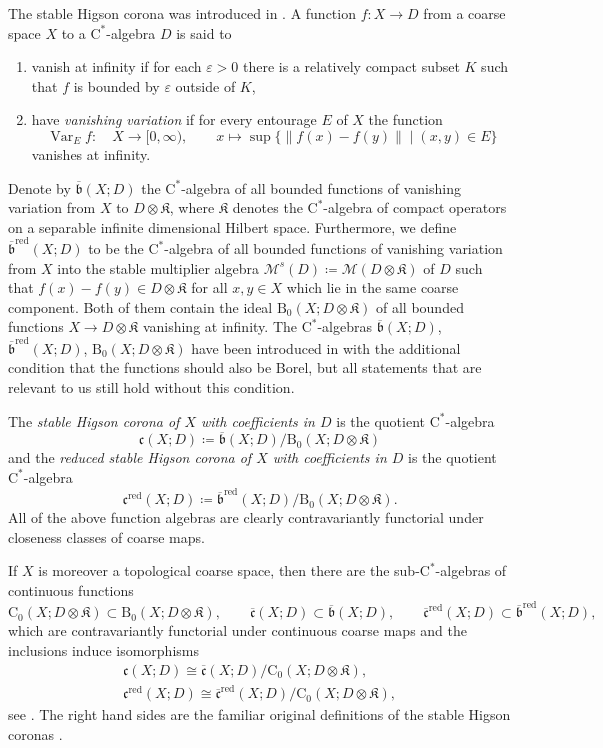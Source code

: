 \documentclass[pdftex]{sigma}
\numberwithin{equation}{section}
\theoremstyle{definition}
\newcommand{\Ct}{\mathrm{C}}
\newcommand{\Cz}{\Ct_0}
\DeclareMathOperator{\Var}{Var}
\newcommand{\textCstar}{\ensuremath{\mathrm{C}^*\!}}
\newcommand{\sHigCom}{\overline{\mathfrak{c}}}
\newcommand{\sHigCor}{\mathfrak{c}}
\newcommand{\sHigComRed}{\overline{\mathfrak{c}}^{\mathrm{red}}}
\newcommand{\sHigCorRed}{\mathfrak{c}^{\mathrm{red}}}
\newcommand{\sHigFuAlg}{\overline{\mathfrak{b}}}
\newcommand{\sHigFuAlgRed}{\overline{\mathfrak{b}}^{\mathrm{red}}}
\newcommand{\VanInfFuAlg}{\mathrm{B}_0}
\newcommand{\Kom}{{\mathfrak{K}}}
\newcommand{\multiplier}{{\mathcal{M}}}
\begin{document}
The stable Higson corona was introduced in \cite{EmeMeyDualizing}.
A function $f\colon X\to D$ from a coarse space $X$ to a \textCstar-algebra $D$ is said to
\begin{enumerate}\itemsep=0pt
\item[$\bullet$] vanish at infinity if for each $\varepsilon>0$ there is a relatively compact subset $K$ such that $f$ is bounded by $\varepsilon$ outside of $K$,
\item[$\bullet$] have \emph{vanishing variation} if for every entourage $E$ of $X$ the function
\[
\Var_Ef\colon\quad X\to [0,\infty),\qquad x\mapsto \sup\{\|f(x)-f(y)\|\mid(x,y)\in E\}
\]
vanishes at infinity.
\end{enumerate}
Denote by $\sHigFuAlg(X;D)$ the \textCstar-algebra of all bounded functions of vanishing variation from $X$ to $D\otimes\Kom$, where $\Kom$ denotes the \textCstar-algebra of compact operators on a separable infinite dimensional Hilbert space. Furthermore, we define $\sHigFuAlgRed(X;D)$ to be the \textCstar-algebra of all bounded functions of vanishing variation from $X$ into the stable multiplier algebra $\multiplier^s(D)\coloneqq\multiplier(D\otimes\Kom)$ of $D$ such that $f(x)-f(y)\in D\otimes\Kom$ for all $x,y\in X$ which lie in the same coarse component.
Both of them contain the ideal $\VanInfFuAlg(X;D\otimes\Kom)$ of all bounded functions $X\to D\otimes\Kom$ vanishing at infinity. The \textCstar-algebras $\sHigFuAlg(X;D)$, $\sHigFuAlgRed(X;D)$, $\VanInfFuAlg(X;D\otimes\Kom)$ have been introduced in \cite[proof of Proposition~3.7]{EmeMeyDualizing} with the additional condition that the functions should also be Borel, but all statements that are relevant to us still hold without this condition.

The \emph{stable Higson corona of $X$ with coefficients in $D$} is the quotient \textCstar-algebra
\[
\sHigCor(X;D)\coloneqq \sHigFuAlg(X;D)/\VanInfFuAlg(X;D\otimes\Kom)
\]
and the \emph{reduced stable Higson corona of $X$ with coefficients in $D$} is the quotient \textCstar-algebra
\[
\sHigCorRed(X;D)\coloneqq \sHigFuAlgRed(X;D)/\VanInfFuAlg(X;D\otimes\Kom).
\]
All of the above function algebras are clearly contravariantly functorial under closeness classes of coarse maps.

If $X$ is moreover a topological coarse space, then there are the sub-\textCstar-algebras of continuous functions
\[
\Cz(X;D\otimes\Kom)\subset\VanInfFuAlg(X;D\otimes\Kom),\qquad
\sHigCom(X;D)\subset\sHigFuAlg(X;D),\qquad
\sHigComRed(X;D)\subset\sHigFuAlgRed(X;D),
\]
which are contravariantly functorial under continuous coarse maps and the inclusions induce isomorphisms
\begin{gather}
\sHigCor(X;D)\cong \sHigCom(X;D)/\Cz(X;D\otimes\Kom),\nonumber
\\
\sHigCorRed(X;D)\cong \sHigComRed(X;D)/\Cz(X;D\otimes\Kom),\label{eq:sHigCorcontinuousrepresentatives}
\end{gather}
see \cite[proof of Proposition 3.7]{EmeMeyDualizing}.
The right hand sides are the familiar original definitions of the stable Higson coronas \cite[Definitions 3.2 and 5.4]{EmeMeyDualizing}.
\end{document}
